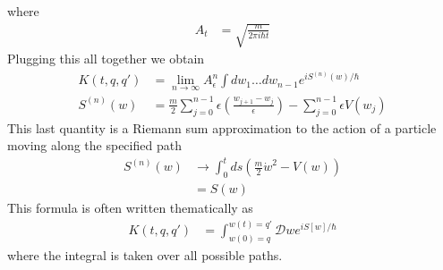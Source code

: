 \documentclass[book.tex]{subfiles}
\begin{document}
where
\begin{align}
    A_t &= \sqrt{\frac{m}{2\pi i \hbar t}}
\end{align}
Plugging this all together we obtain
\begin{align}
    K(t, q, q') &= \lim_{n\to\infty} A_{\epsilon}^n \int dw_1 \dotsc dw_{n-1}e^{iS^{(n)}(w)/\hbar} \\
    S^{(n)}(w) &= \frac{m}{2}\sum_{j=0}^{n-1}\epsilon \left ( \frac{w_{j+1} - w_j}{\epsilon}\right) - \sum_{j=0}^{n-1} \epsilon V(w_j)
\end{align}
This last quantity is a Riemann sum approximation to the action of a particle moving along the specified path
\begin{align}
    S^{(n)}(w) &\to \int_0^t ds (\frac{m}{2}\dot{w}^2 - V(w)) \\
    &= S(w)
\end{align}
This formula is often written thematically as
\begin{align}
K(t, q, q') &= \int_{w(0)=q}^{w(t) =q'} \mathcal{D}w e^{iS[w]/\hbar}
\end{align}
where the integral is taken over all possible paths.
\end{document}
